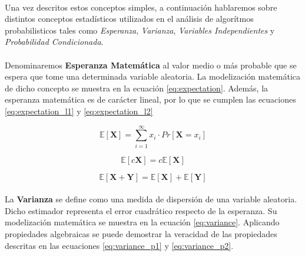 \documentclass{subfiles}
\begin{document}
        \paragraph{}
        Una vez descritos estos conceptos simples, a continuación hablaremos sobre distintos conceptos estadísticos utilizados en el análisis de algorítmos probabilisticos tales como \emph{Esperanza}, \emph{Varianza}, \emph{Variables Independientes} y \emph{Probabilidad Condicionada}.

        \paragraph{}
        Denominaremos \textbf{Esperanza Matemática} al valor medio o más probable que se espera que tome una determinada variable aleatoria. La modelización matemática de dicho concepto se muestra en la ecuación \eqref{eq:expectation}. Además, la esperanza matemática es de carácter lineal, por lo que se cumplen las ecuaciones \eqref{eq:expectation_l1} y \eqref{eq:expectation_l2}

        \begin{equation}
        \label{eq:expectation}
          \mathbb{E}[\boldsymbol{X}] = \sum_{i=1}^\infty x_i \cdot Pr[\boldsymbol{X} = x_i]
        \end{equation}

        \begin{equation}
        \label{eq:expectation_l1}
          \mathbb{E}[c\boldsymbol{X}] = c \mathbb{E}[\boldsymbol{X}]
        \end{equation}

        \begin{equation}
        \label{eq:expectation_l2}
          \mathbb{E}[\boldsymbol{X} + \boldsymbol{Y}] = \mathbb{E}[\boldsymbol{X}] + \mathbb{E}[\boldsymbol{Y}]
        \end{equation}


        \paragraph{}
        La \textbf{Varianza} se define como una medida de dispersión de una variable aleatoria. Dicho estimador representa el error cuadrático respecto de la esperanza. Su modelización matemática se muestra en la ecuación \eqref{eq:variance}. Aplicando propiedades algebraicas se puede demostrar la veracidad de las propiedades descritas en las ecuaciones \eqref{eq:variance_p1} y \eqref{eq:variance_p2}.
\end{document}
